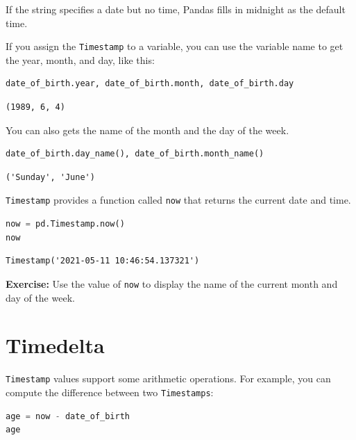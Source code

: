 If the string specifies a date but no time, Pandas fills in midnight as
the default time.

If you assign the \passthrough{\lstinline!Timestamp!} to a variable, you
can use the variable name to get the year, month, and day, like this:

\begin{lstlisting}[language=Python,style=source]
date_of_birth.year, date_of_birth.month, date_of_birth.day
\end{lstlisting}

\begin{lstlisting}[style=output]
(1989, 6, 4)
\end{lstlisting}

You can also gets the name of the month and the day of the week.

\begin{lstlisting}[language=Python,style=source]
date_of_birth.day_name(), date_of_birth.month_name()
\end{lstlisting}

\begin{lstlisting}[style=output]
('Sunday', 'June')
\end{lstlisting}

\passthrough{\lstinline!Timestamp!} provides a function called
\passthrough{\lstinline!now!} that returns the current date and time.

\begin{lstlisting}[language=Python,style=source]
now = pd.Timestamp.now()
now
\end{lstlisting}

\begin{lstlisting}[style=output]
Timestamp('2021-05-11 10:46:54.137321')
\end{lstlisting}

\textbf{Exercise:} Use the value of \passthrough{\lstinline!now!} to
display the name of the current month and day of the week.

\hypertarget{timedelta}{%
\section{Timedelta}\label{timedelta}}

\passthrough{\lstinline!Timestamp!} values support some arithmetic
operations. For example, you can compute the difference between two
\passthrough{\lstinline!Timestamps!}:

\begin{lstlisting}[language=Python,style=source]
age = now - date_of_birth
age
\end{lstlisting}

